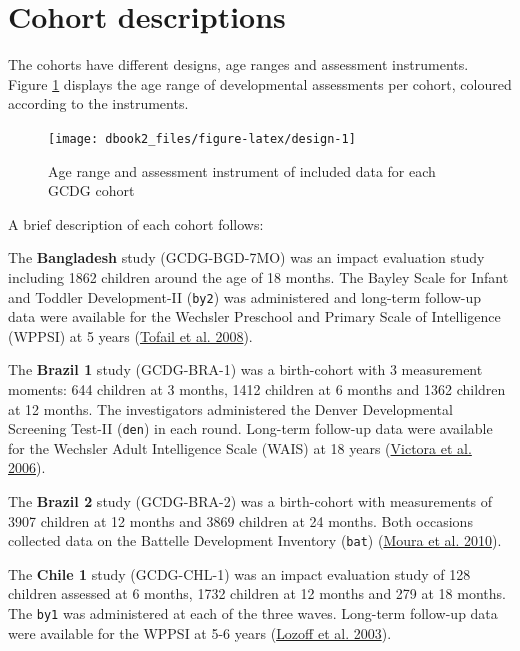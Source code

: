 \documentclass[
]{book}
\begin{document}
\hypertarget{sec:cohorts}{%
\section{Cohort descriptions}\label{sec:cohorts}}

The cohorts have different designs, age ranges and assessment instruments. Figure \ref{fig:design} displays the age range of developmental assessments per cohort, coloured according to the instruments.

\begin{figure}

{\centering \texttt{[image: dbook2\_files/figure-latex/design-1]} 

}

\caption{Age range and assessment instrument of included data for each GCDG cohort}\label{fig:design}
\end{figure}



A brief description of each cohort follows:

The \textbf{Bangladesh} study (GCDG-BGD-7MO) was an impact evaluation study including 1862 children around the age of 18 months. The Bayley Scale for Infant and Toddler Development-II (\texttt{by2}) was administered and long-term follow-up data were available for the Wechsler Preschool and Primary Scale of Intelligence (WPPSI) at 5 years (\protect\hyperlink{ref-Tofail2008}{Tofail et al. 2008}).

The \textbf{Brazil 1} study (GCDG-BRA-1) was a birth-cohort with 3 measurement moments: 644 children at 3 months, 1412 children at 6 months and 1362 children at 12 months. The investigators administered the Denver Developmental Screening Test-II (\texttt{den}) in each round. Long-term follow-up data were available for the Wechsler Adult Intelligence Scale (WAIS) at 18 years (\protect\hyperlink{ref-Victora2006}{Victora et al. 2006}).

The \textbf{Brazil 2} study (GCDG-BRA-2) was a birth-cohort with measurements of 3907 children at 12 months and 3869 children at 24 months. Both occasions collected data on the Battelle Development Inventory (\texttt{bat}) (\protect\hyperlink{ref-Moura2010}{Moura et al. 2010}).

The \textbf{Chile 1} study (GCDG-CHL-1) was an impact evaluation study of 128 children assessed at 6 months, 1732 children at 12 months and 279 at 18 months. The \texttt{by1} was administered at each of the three waves. Long-term follow-up data were available for the WPPSI at 5-6 years (\protect\hyperlink{ref-Lozoff2003}{Lozoff et al. 2003}).
\end{document}
